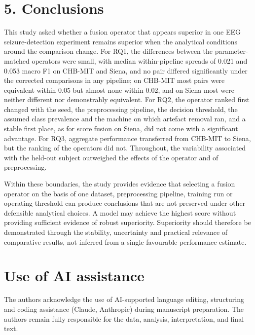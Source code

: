 \documentclass[11pt,a4paper]{article}
\newcounter{none} %
\begin{document}
\section{5. Conclusions}\label{conclusions}

This study asked whether a fusion operator that appears superior in one EEG
seizure-detection experiment remains superior when the analytical conditions around the
comparison change. For RQ1, the differences between the parameter-matched operators were
small, with median within-pipeline spreads of 0.021 and 0.053 macro F1 on CHB-MIT and
Siena, and no pair differed significantly under the corrected comparisons in any
pipeline; on CHB-MIT most pairs were equivalent within 0.05 but almost none within 0.02,
and on Siena most were neither different nor demonstrably equivalent. For RQ2, the
operator ranked first changed with the seed, the preprocessing pipeline, the decision
threshold, the assumed class prevalence and the machine on which artefact removal ran,
and a stable first place, as for score fusion on Siena, did not come with a significant
advantage. For RQ3, aggregate performance transferred from CHB-MIT to Siena, but the
ranking of the operators did not. Throughout, the variability associated with the
held-out subject outweighed the effects of the operator and of preprocessing.

Within these boundaries, the study provides evidence that selecting a fusion operator on
the basis of one dataset, preprocessing pipeline, training run or operating threshold can
produce conclusions that are not preserved under other defensible analytical choices. A
model may achieve the highest score without providing sufficient evidence of robust
superiority. Superiority should therefore be demonstrated through the stability,
uncertainty and practical relevance of comparative results, not inferred from a single
favourable performance estimate.

\section{Use of AI assistance}\label{use-of-ai-assistance}

The authors acknowledge the use of AI-supported language editing, structuring and
coding assistance (Claude, Anthropic) during manuscript preparation. The authors remain
fully responsible for the data, analysis, interpretation, and final text.



\end{document}
